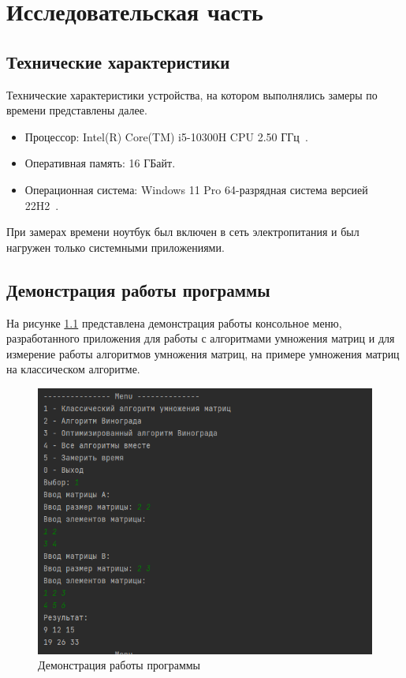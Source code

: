 \chapter{Исследовательская часть}

\section{Технические характеристики}

Технические характеристики устройства, на котором выполнялись замеры по времени представлены далее.

\begin{itemize}
	\item Процессор: Intel(R) Core(TM) i5-10300H CPU 2.50 ГГц~\cite{intel}.
	\item Оперативная память: 16 ГБайт.
	\item Операционная система: Windows 11 Pro 64-разрядная система версией 22H2~\cite{windows}.
\end{itemize}

При замерах времени ноутбук был включен в сеть электропитания и был нагружен только системными приложениями.

\clearpage

\section{Демонстрация работы программы}

На рисунке \ref{img:demonstration} представлена демонстрация работы консольное меню, разработанного приложения для работы с алгоритмами умножения матриц и для измерение работы алгоритмов умножения матриц, на примере умножения матриц на классическом алгоритме.

\begin{figure}[h]
	\centering
	\includegraphics[height=0.5\textheight]{img/example.png}
	\caption{Демонстрация работы программы}
	\label{img:demonstration}
\end{figure}


